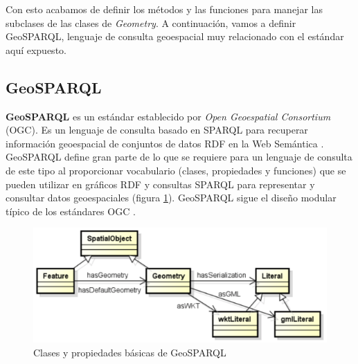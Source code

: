  


Con esto acabamos de definir los métodos y las funciones para manejar las subclases de las clases de \textit{Geometry}. A continuación, vamos a definir GeoSPARQL, lenguaje de consulta geoespacial muy relacionado con el estándar aquí expuesto.

\subsection{GeoSPARQL}

\textbf{GeoSPARQL} es un estándar establecido por \textit{Open Geoespatial Consortium} (OGC). Es un lenguaje de consulta basado en SPARQL para recuperar información geoespacial de conjuntos de datos RDF en la Web Semántica \cite{libro-gis}. GeoSPARQL define gran parte de lo que se requiere para un lenguaje de consulta de este tipo al proporcionar vocabulario (clases, propiedades y funciones) que se pueden utilizar en gráficos RDF y consultas SPARQL para representar y consultar datos geoespaciales (figura \ref{fig:geosparql}). GeoSPARQL sigue el diseño modular típico de los estándares OGC \cite{ogc-geo, wkt-database}.


\begin{figure}[H]
	\centering
	\includegraphics[width=0.9\linewidth]{imagenes/capitulo3/geosparql}
	\caption{Clases y propiedades básicas de GeoSPARQL \cite{tesis-otro}}
	\label{fig:geosparql}
\end{figure}

